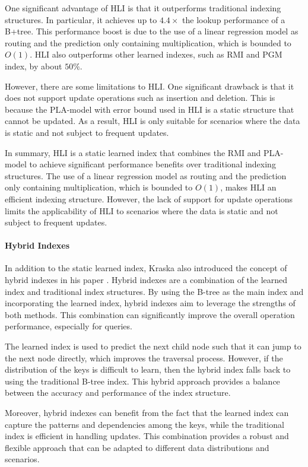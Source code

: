 One significant advantage of HLI is that it outperforms traditional indexing structures. In particular, it achieves up to $4.4\times$ the lookup performance of a B+tree. This performance boost is due to the use of a linear regression model as routing and the prediction only containing multiplication, which is bounded to $O(1)$. HLI also outperforms other learned indexes, such as RMI and PGM index, by about $50\%$.

However, there are some limitations to HLI. One significant drawback is that it does not support update operations such as insertion and deletion. This is because the PLA-model with error bound used in HLI is a static structure that cannot be updated. As a result, HLI is only suitable for scenarios where the data is static and not subject to frequent updates.

In summary, HLI is a static learned index that combines the RMI and PLA-model to achieve significant performance benefits over traditional indexing structures. The use of a linear regression model as routing and the prediction only containing multiplication, which is bounded to $O(1)$, makes HLI an efficient indexing structure. However, the lack of support for update operations limits the applicability of HLI to scenarios where the data is static and not subject to frequent updates.


\paragraph{Hybrid Indexes}

In addition to the static learned index, Kraska also introduced the concept of hybrid indexes in his paper \cite{CasedLearnedIndex}. Hybrid indexes are a combination of the learned index and traditional index structures. By using the B-tree as the main index and incorporating the learned index, hybrid indexes aim to leverage the strengths of both methods. This combination can significantly improve the overall operation performance, especially for queries.

The learned index is used to predict the next child node such that it can jump to the next node directly, which improves the traversal process. However, if the distribution of the keys is difficult to learn, then the hybrid index falls back to using the traditional B-tree index. This hybrid approach provides a balance between the accuracy and performance of the index structure.

Moreover, hybrid indexes can benefit from the fact that the learned index can capture the patterns and dependencies among the keys, while the traditional index is efficient in handling updates. This combination provides a robust and flexible approach that can be adapted to different data distributions and scenarios.

